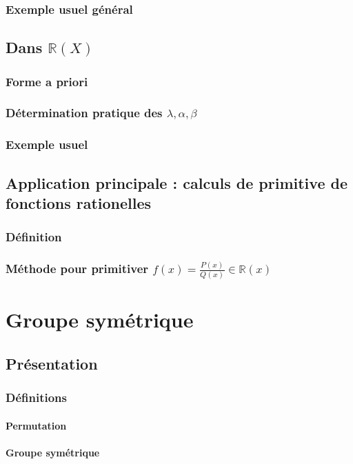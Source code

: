 \documentclass[12pt,a4paper,french]{book}
\begin{document}
		\subsection{Exemple usuel général}
	\section{Dans $\mathbb{R}(X)$}
		\subsection{Forme a priori}
		\subsection{Détermination pratique des $\lambda,\alpha,\beta$}
		\subsection{Exemple usuel}
	\section{Application principale : calculs de primitive de fonctions rationelles}
		\subsection{Définition}
		\subsection{Méthode pour primitiver $f(x)=\frac{P(x)}{Q(x)} \in \mathbb{R}(x)$}
		
\chapter{Groupe symétrique}
	\section{Présentation}
		\subsection{Définitions}
			\subsubsection{Permutation}
			\subsubsection{Groupe symétrique}
\end{document}
